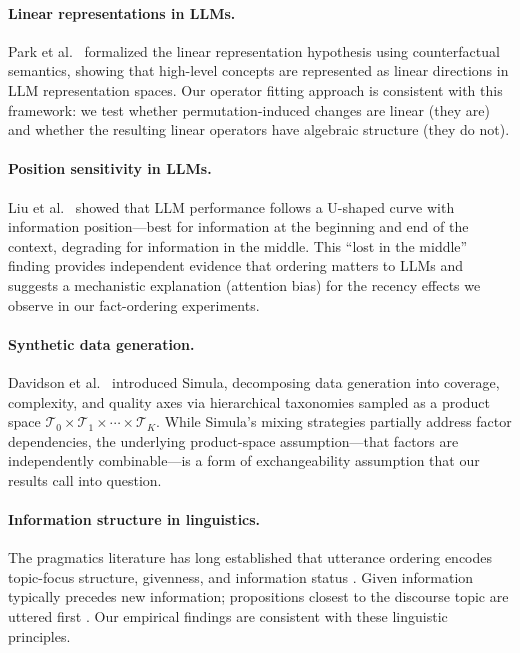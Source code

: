 \documentclass[10pt, letterpaper]{article}
\begin{document}
\paragraph{Linear representations in LLMs.} Park et al.\ \cite{park2024linear} formalized the linear representation hypothesis using counterfactual semantics, showing that high-level concepts are represented as linear directions in LLM representation spaces. Our operator fitting approach is consistent with this framework: we test whether permutation-induced changes are linear (they are) and whether the resulting linear operators have algebraic structure (they do not).

\paragraph{Position sensitivity in LLMs.} Liu et al.\ \cite{liu2024lost} showed that LLM performance follows a U-shaped curve with information position---best for information at the beginning and end of the context, degrading for information in the middle. This ``lost in the middle'' finding provides independent evidence that ordering matters to LLMs and suggests a mechanistic explanation (attention bias) for the recency effects we observe in our fact-ordering experiments.

\paragraph{Synthetic data generation.} Davidson et al.\ \cite{davidson2026simula} introduced Simula, decomposing data generation into coverage, complexity, and quality axes via hierarchical taxonomies sampled as a product space $\mathcal{T}_0 \times \mathcal{T}_1 \times \cdots \times \mathcal{T}_K$. While Simula's mixing strategies partially address factor dependencies, the underlying product-space assumption---that factors are independently combinable---is a form of exchangeability assumption that our results call into question.

\paragraph{Information structure in linguistics.} The pragmatics literature has long established that utterance ordering encodes topic-focus structure, givenness, and information status \cite{krifka2008, lambrecht1994}. Given information typically precedes new information; propositions closest to the discourse topic are uttered first \cite{vandijk1977}. Our empirical findings are consistent with these linguistic principles.
\end{document}

